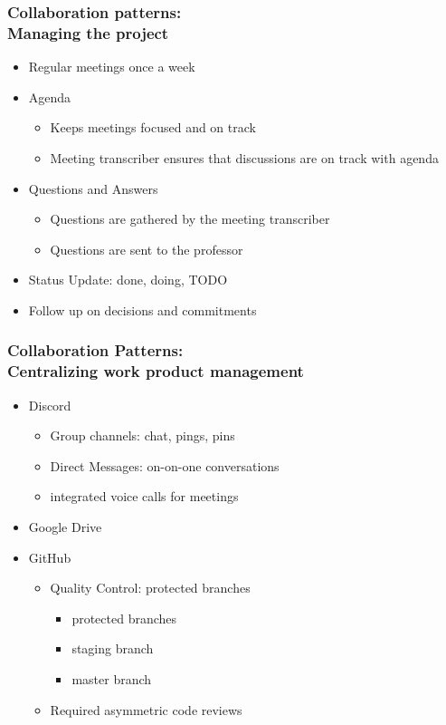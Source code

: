 \documentclass{beamer}
\begin{document}
  \begin{frame}
  \frametitle{Collaboration patterns:\\ Managing the project}
  \begin{itemize}
   \item Regular meetings once a week
   \item Agenda
     \begin{itemize}
     \item Keeps meetings focused and on track
     \item Meeting transcriber ensures that discussions are on track with agenda
     \end{itemize}
   \item Questions and Answers
      \begin{itemize}
     \item Questions are gathered by the meeting transcriber
     \item Questions are sent to the professor
     \end{itemize}
   \item Status Update: done, doing, TODO
   \item Follow up on decisions and commitments
  \end{itemize}
  \end{frame}

  \begin{frame}
  \frametitle{Collaboration Patterns: \\ Centralizing work product management}
  \begin{itemize}
   \item Discord
    \begin{itemize}
     \item Group channels: chat, pings, pins
     \item Direct Messages: on-on-one conversations
     \item integrated voice calls for meetings
    \end{itemize}
   \item Google Drive
   \item GitHub
    \begin{itemize}
     \item Quality Control: protected branches
       \begin{itemize}
          \item protected branches
          \item staging branch
          \item master branch
      \end{itemize}
     \item Required asymmetric code reviews
    \end{itemize}
  \end{itemize}
  \end{frame}
\end{document}
